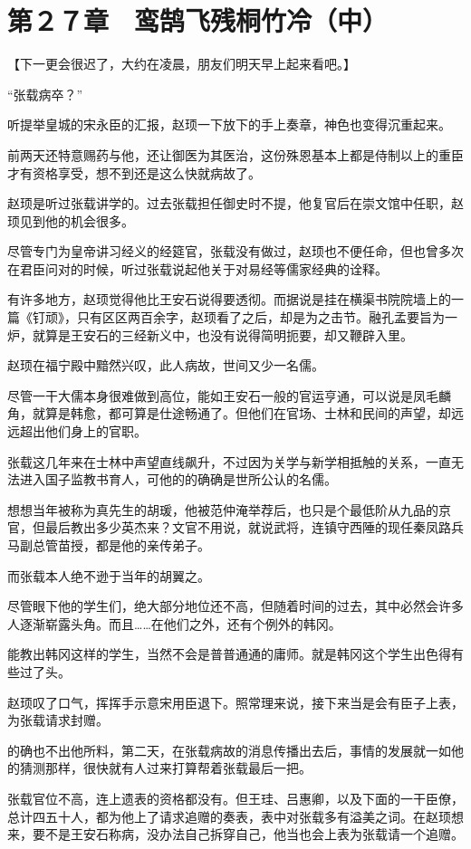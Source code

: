 \section{第２７章　鸾鹄飞残桐竹冷（中）}

【下一更会很迟了，大约在凌晨，朋友们明天早上起来看吧。】

“张载病卒？”

听提举皇城的宋永臣的汇报，赵顼一下放下的手上奏章，神色也变得沉重起来。

前两天还特意赐药与他，还让御医为其医治，这份殊恩基本上都是侍制以上的重臣才有资格享受，想不到还是这么快就病故了。

赵顼是听过张载讲学的。过去张载担任御史时不提，他复官后在崇文馆中任职，赵顼见到他的机会很多。

尽管专门为皇帝讲习经义的经筵官，张载没有做过，赵顼也不便任命，但也曾多次在君臣问对的时候，听过张载说起他关于对易经等儒家经典的诠释。

有许多地方，赵顼觉得他比王安石说得要透彻。而据说是挂在横渠书院院墙上的一篇《钉顽》，只有区区两百余字，赵顼看了之后，却是为之击节。融孔孟要旨为一炉，就算是王安石的三经新义中，也没有说得简明扼要，却又鞭辟入里。

赵顼在福宁殿中黯然兴叹，此人病故，世间又少一名儒。

尽管一干大儒本身很难做到高位，能如王安石一般的官运亨通，可以说是凤毛麟角，就算是韩愈，都可算是仕途畅通了。但他们在官场、士林和民间的声望，却远远超出他们身上的官职。

张载这几年来在士林中声望直线飙升，不过因为关学与新学相抵触的关系，一直无法进入国子监教书育人，可他的的确确是世所公认的名儒。

想想当年被称为真先生的胡瑗，他被范仲淹举荐后，也只是个最低阶从九品的京官，但最后教出多少英杰来？文官不用说，就说武将，连镇守西陲的现任秦凤路兵马副总管苗授，都是他的亲传弟子。

而张载本人绝不逊于当年的胡翼之。

尽管眼下他的学生们，绝大部分地位还不高，但随着时间的过去，其中必然会许多人逐渐崭露头角。而且……在他们之外，还有个例外的韩冈。

能教出韩冈这样的学生，当然不会是普普通通的庸师。就是韩冈这个学生出色得有些过了头。

赵顼叹了口气，挥挥手示意宋用臣退下。照常理来说，接下来当是会有臣子上表，为张载请求封赠。

的确也不出他所料，第二天，在张载病故的消息传播出去后，事情的发展就一如他的猜测那样，很快就有人过来打算帮着张载最后一把。

张载官位不高，连上遗表的资格都没有。但王珪、吕惠卿，以及下面的一干臣僚，总计四五十人，都为他上了请求追赠的奏表，表中对张载多有溢美之词。在赵顼想来，要不是王安石称病，没办法自己拆穿自己，他当也会上表为张载请一个追赠。


